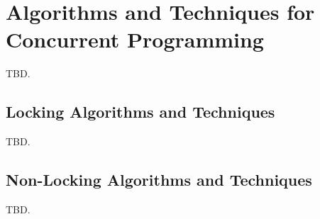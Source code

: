 \section{Algorithms and Techniques for Concurrent Programming}
\label{satq0}

TBD.


\subsection{Locking Algorithms and Techniques}
\label{satq0:sloc0}

TBD.


\subsection{Non-Locking Algorithms and Techniques}
\label{satq0:snlo0}

TBD.

